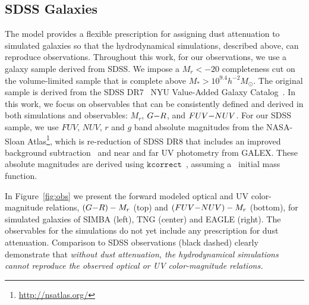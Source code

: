 \subsection{SDSS Galaxies} \label{sec:obs} 
The \eda model provides a flexible prescription for assigning dust attenuation
to simulated galaxies so that the hydrodynamical simulations, described above,
can reproduce observations. Throughout this work, for our observations, we use
a galaxy sample derived from SDSS.  %
We impose a $M_r < -20$ completeness cut on the \cite{tinker2011} volume-limited 
sample that is complete above $M_* > 10^{9.4} h^{-2}M_\odot$. The original
\cite{tinker2011} sample is derived from the SDSS DR7~\citep{abazajian2009} NYU
Value-Added Galaxy Catalog~\citep[VAGC;][]{blanton2005}. In this work, we focus 
on observables that can be consistently defined and derived in both simulations 
and observables: $M_r$, $G{-}R$, and $FUV{-}NUV$. For our SDSS sample, we use $FUV$,
$NUV$, $r$ and $g$ band absolute magnitudes from the NASA-Sloan
Atlas\footnote{\url{http://nsatlas.org/}}, which is re-reduction of SDSS DR8
\citep{aihara2011} that includes an improved background subtraction~\citep{blanton2011} 
and near and far UV photometry from GALEX. These absolute magnitudes are
derived using $\mathtt{kcorrect}$~\citep{blanton2007a}, assuming
a~\cite{chabrier2003} initial mass function. 

In Figure~\ref{fig:obs} we present the forward modeled optical and UV color-magnitude
relations, $(G{-}R)-M_r$ (top) and $(FUV{-}NUV)-M_r$ (bottom), for simulated galaxies
of SIMBA (left), TNG (center) and EAGLE (right). The observables for the
simulations do not yet include any prescription for dust attenuation.
Comparison to SDSS observations (black dashed) clearly demonstrate
that {\em without dust attenuation, the hydrodynamical simulations cannot
reproduce the observed optical or UV color-magnitude relations.}

